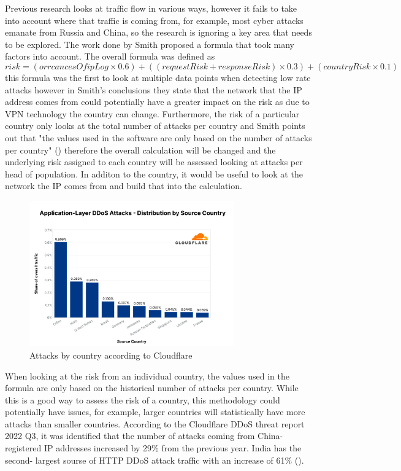 Previous research looks at traffic flow in various ways, however it fails to take into account where that traffic is coming from, for example, most cyber attacks emanate from Russia and China, so the research is ignoring a key area that needs to be explored. The work done by Smith proposed a formula that took many factors  into account. The overall formula was defined as  \[risk = (orrcancesOfipLog \times 0.6) + ((requestRisk+responseRisk) \times 0.3) + (countryRisk \times  0.1) \] this formula was the first to look at multiple data points when detecting low rate attacks however in Smith's conclusions they state that the network that the IP address comes from could potentially have a greater impact on the risk as due to VPN technology the country can change. Furthermore, the risk of a particular country only looks at the total number of attacks per country and Smith points out that  "the values used in the software are only based on the number of attacks per country" (\cite{smith}) therefore the overall calculation will be changed and the underlying risk assigned to each country will be assessed looking at attacks per head of population. In additon to the country, it would be useful to look at the network the IP comes from and build that into the calculation. 

\begin{figure}
\label{web using h2}
    \includegraphics[width=88mm,scale=0.4]{images/CF q3.png} 
    \caption{Attacks by country according to Cloudflare}
\end{figure}
When looking at the risk from an individual country, the values used in the formula are only based on the historical number of attacks per country. While this is a good way to assess the risk of a country, this methodology could potentially have issues, for example, larger countries will statistically have more attacks than smaller countries. According to the Cloudflare DDoS threat report 2022 Q3, it was identified that the number of attacks coming from China- registered IP addresses increased by 29\% from the previous year. India has the second- largest sourse of HTTP DDoS attack traffic with an increase of 61\% (\cite{Q3attacks}).

